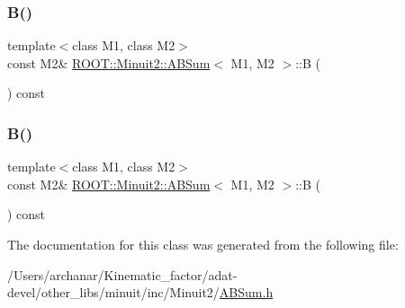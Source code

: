 \mbox{\label{classROOT_1_1Minuit2_1_1ABSum_a6370bd6e7593778d1933ef761dad2449}} 
\subsubsection{\texorpdfstring{B()}{B()}\hspace{0.1cm}{\footnotesize\ttfamily [2/3]}}
{\footnotesize\ttfamily template$<$class M1, class M2$>$ \\
const M2\& \mbox{\hyperlink{classROOT_1_1Minuit2_1_1ABSum}{R\+O\+O\+T\+::\+Minuit2\+::\+A\+B\+Sum}}$<$ M1, M2 $>$\+::B (\begin{DoxyParamCaption}{ }\end{DoxyParamCaption}) const\hspace{0.3cm}{\ttfamily [inline]}}

\mbox{\label{classROOT_1_1Minuit2_1_1ABSum_a6370bd6e7593778d1933ef761dad2449}} 
\subsubsection{\texorpdfstring{B()}{B()}\hspace{0.1cm}{\footnotesize\ttfamily [3/3]}}
{\footnotesize\ttfamily template$<$class M1, class M2$>$ \\
const M2\& \mbox{\hyperlink{classROOT_1_1Minuit2_1_1ABSum}{R\+O\+O\+T\+::\+Minuit2\+::\+A\+B\+Sum}}$<$ M1, M2 $>$\+::B (\begin{DoxyParamCaption}{ }\end{DoxyParamCaption}) const\hspace{0.3cm}{\ttfamily [inline]}}



The documentation for this class was generated from the following file\+:\begin{DoxyCompactItemize}
\item 
/\+Users/archanar/\+Kinematic\+\_\+factor/adat-\/devel/other\+\_\+libs/minuit/inc/\+Minuit2/\mbox{\hyperlink{adat-devel_2other__libs_2minuit_2inc_2Minuit2_2ABSum_8h}{A\+B\+Sum.\+h}}\end{DoxyCompactItemize}
